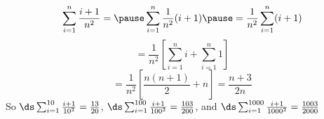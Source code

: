
\begin{frame}
\begin{example}
\[
\sum_{i=1}^n \frac{i+1}{n^2} = \pause \sum_{i=1}^n \frac{1}{n^2}(i+1) \pause = \frac{1}{n^2} \sum_{i=1}^n (i+1) 
\]
\pause 
\[
= \frac{1}{n^2} \left[ \sum_{i=1}^n i+\sum_{i=1}^n 1 \right]
\]
\pause 
\[
= \frac{1}{n^2} \left[ \frac{n(n+1)}{2}+n \right] = \frac{n+3}{2n}
\]
\pause
So $ \ds \sum_{i=1}^{10} \frac{i+1}{10^2} =\frac{13}{20} $, \pause $ \ds \sum_{i=1}^{100} \frac{i+1}{100^2} =\frac{103}{200} $, \pause and $ \ds \sum_{i=1}^{1000} \frac{i+1}{1000^2} =\frac{1003}{2000} $ 
\end{example}
\end{frame}
